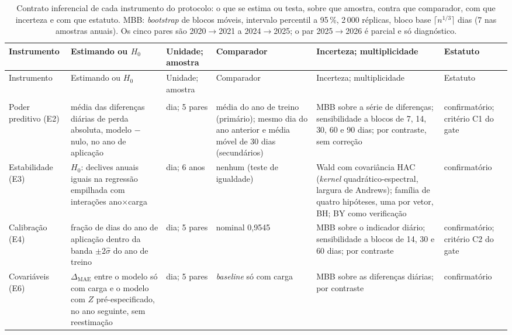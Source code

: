 {\footnotesize
\begin{xltabular}{\linewidth}{@{}>{\raggedright\arraybackslash}p{1.9cm}>{\raggedright\arraybackslash}X>{\raggedright\arraybackslash}p{1.8cm}>{\raggedright\arraybackslash}p{2.6cm}>{\raggedright\arraybackslash}X>{\raggedright\arraybackslash}p{1.9cm}@{}}
\caption[Contrato inferencial de cada instrumento]{Contrato inferencial
  de cada instrumento do protocolo: o que se estima ou testa, sobre que
  amostra, contra que comparador, com que incerteza e com que estatuto.
  MBB: \emph{bootstrap} de blocos móveis, intervalo percentil a 95\,\%,
  2\,000 réplicas, bloco base $\lceil n^{1/3}\rceil$ dias (7 nas amostras
  anuais). Os cinco pares são 2020${\to}$2021 a 2024${\to}$2025; o par
  2025${\to}$2026 é parcial e só diagnóstico.}\label{tab:contrato-inferencial}\\
\toprule
Instrumento & Estimando ou $H_0$ & Unidade; amostra & Comparador & Incerteza; multiplicidade & Estatuto \\
\midrule
\endfirsthead
\toprule
Instrumento & Estimando ou $H_0$ & Unidade; amostra & Comparador & Incerteza; multiplicidade & Estatuto \\
\midrule
\endhead
\midrule
{}\\
\endfoot
\bottomrule
\endlastfoot
    Poder preditivo (E2) & média das diferenças diárias de perda absoluta, modelo $-$ nulo, no ano de aplicação & dia; 5 pares & média do ano de treino (primário); mesmo dia do ano anterior e média móvel de 30 dias (secundários) & MBB sobre a série de diferenças; sensibilidade a blocos de 7, 14, 30, 60 e 90 dias; por contraste, sem correção & confirmatório; critério C1 do gate \\
    \addlinespace
    Estabilidade (E3) & $H_0$: declives anuais iguais na regressão empilhada com interações ano$\times$carga & dia; 6 anos & nenhum (teste de igualdade) & Wald com covariância HAC (\emph{kernel} quadrático-espectral, largura de Andrews); família de quatro hipóteses, uma por vetor, BH; BY como verificação & confirmatório \\
    \addlinespace
    Calibração (E4) & fração de dias do ano de aplicação dentro da banda $\pm2\hat\sigma$ do ano de treino & dia; 5 pares & nominal 0,9545 & MBB sobre o indicador diário; sensibilidade a blocos de 14, 30 e 60 dias; por contraste & confirmatório; critério C2 do gate \\
    \addlinespace
    Covariáveis (E6) & $\Delta_{\mathrm{MAE}}$ entre o modelo só com carga e o modelo com $Z$ pré-especificado, no ano seguinte, sem reestimação & dia; 5 pares & \emph{baseline} só com carga & MBB sobre as diferenças diárias; por contraste & confirmatório \\

\end{xltabular}}
